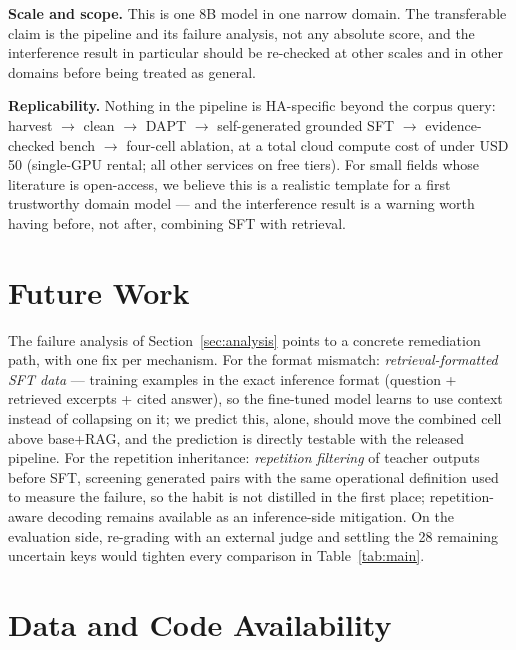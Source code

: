 \documentclass[11pt]{article}
\begin{document}
\textbf{Scale and scope.} This is one 8B model in one narrow domain. The
transferable claim is the pipeline and its failure analysis, not any
absolute score, and the interference result in particular should be
re-checked at other scales and in other domains before being treated as
general.

\textbf{Replicability.} Nothing in the pipeline is HA-specific beyond the
corpus query: harvest $\rightarrow$ clean $\rightarrow$ DAPT $\rightarrow$
self-generated grounded SFT $\rightarrow$ evidence-checked bench
$\rightarrow$ four-cell ablation, at a total cloud compute cost of under
USD 50 (single-GPU rental; all other services on free tiers). For small
fields whose literature is open-access, we believe this is a realistic
template for a first trustworthy domain model --- and the interference
result is a warning worth having before, not after, combining SFT with
retrieval.

\section{Future Work}
\label{sec:future}

The failure analysis of Section~\ref{sec:analysis} points to a concrete
remediation path, with one fix per mechanism. For the format mismatch:
\emph{retrieval-formatted SFT data} --- training examples in the exact
inference format (question + retrieved excerpts + cited answer), so the
fine-tuned model learns to use context instead of collapsing on it; we
predict this, alone, should move the combined cell above base+RAG, and
the prediction is directly testable with the released pipeline. For the
repetition inheritance: \emph{repetition filtering} of teacher outputs
before SFT, screening generated pairs with the same operational
definition used to measure the failure, so the habit is not distilled in
the first place; repetition-aware decoding remains available as an
inference-side mitigation. On the evaluation side, re-grading with an
external judge and settling the 28 remaining uncertain keys would tighten
every comparison in Table~\ref{tab:main}.

\section{Data and Code Availability}
\label{sec:availability}
\end{document}
